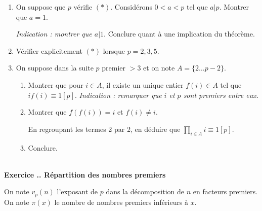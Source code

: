 \documentclass{article}
\newcounter{exo}
\newcommand{\exercice}[1][\null]{\textbf{\\ Exercice \thesection.\theexo. #1} \addtocounter{exo}{1}}
\begin{document}
\begin{enumerate}

\item On suppose que $p$ vérifie $(*)$. Considérons $0 < a <p$ tel que $a | p$. Montrer que $a =1$. 

\emph{Indication : montrer que $a | 1$}. Conclure quant à une implication du théorème.

\item Vérifier explicitement $(*)$ lorsque $p = 2,3,5$.

\item On suppose dans la suite $p$ premier $> 3$ et on note $A = \{2 \dots p-2\}$.

\begin{enumerate}

\item Montrer que pour $i \in A$, il existe un unique entier $f(i) \in A$ tel que $if(i) \equiv 1 [p]$. \emph{Indication : remarquer que $i$ et $p$ sont premiers entre eux.}

\item Montrer que $f(f(i)) =i$ et $f(i) \neq i$.

En regroupant les termes 2 par 2, en déduire que $\prod_{i \in A} i \equiv 1 [p]$.

\item Conclure.

\end{enumerate}

\end{enumerate}







\exercice[Répartition des nombres premiers]

On note $v_p(n)$ l'exposant de $p$ dans la décomposition de $n$ 
en facteurs premiers. On note $\pi(x)$ le nombre de nombres premiers 
inférieurs à $x$.
\end{document}
